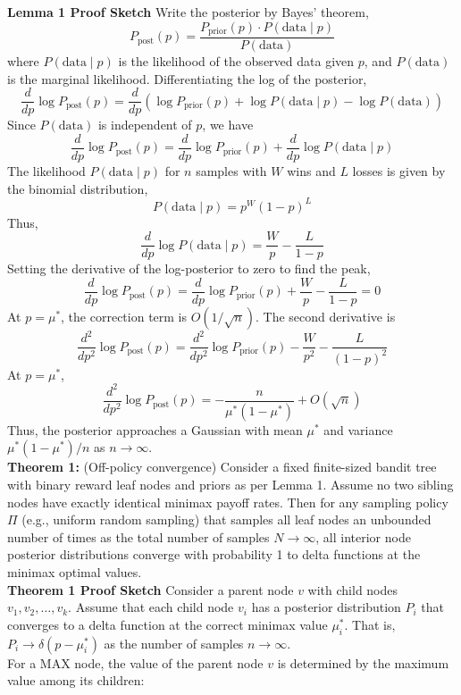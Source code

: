 \documentclass[11pt]{article}
\theoremstyle{definitionstyle}
\begin{document}
\textbf{Lemma 1 Proof Sketch} Write the posterior by Bayes' theorem,
\[
P_{\text{post}}(p) = \frac{P_{\text{prior}}(p) \cdot P(\text{data} \mid p)}{P(\text{data})}
\]
where \(P(\text{data} \mid p)\) is the likelihood of the observed data given \(p\), and \(P(\text{data})\) is the marginal likelihood. Differentiating the log of the posterior,
\[
\frac{d}{dp} \log P_{\text{post}}(p) = \frac{d}{dp} \left( \log P_{\text{prior}}(p) + \log P(\text{data} \mid p) - \log P(\text{data}) \right)
\]
Since \(P(\text{data})\) is independent of \(p\), we have
\[
\frac{d}{dp} \log P_{\text{post}}(p) = \frac{d}{dp} \log P_{\text{prior}}(p) + \frac{d}{dp} \log P(\text{data} \mid p)
\]
The likelihood \(P(\text{data} \mid p)\) for \(n\) samples with \(W\) wins and \(L\) losses is given by the binomial distribution,
\[
P(\text{data} \mid p) = p^W (1 - p)^L
\]
Thus,
\[
\frac{d}{dp} \log P(\text{data} \mid p) = \frac{W}{p} - \frac{L}{1 - p}
\]
Setting the derivative of the log-posterior to zero to find the peak,
\[
\frac{d}{dp} \log P_{\text{post}}(p) = \frac{d}{dp} \log P_{\text{prior}}(p) + \frac{W}{p} - \frac{L}{1 - p} = 0
\]
At \(p = \mu^*\), the correction term is \(O(1/\sqrt{n})\). The second derivative is
\[
\frac{d^2}{dp^2} \log P_{\text{post}}(p) = \frac{d^2}{dp^2} \log P_{\text{prior}}(p) - \frac{W}{p^2} - \frac{L}{(1 - p)^2}
\]
At \(p = \mu^*\),
\[
\frac{d^2}{dp^2} \log P_{\text{post}}(p) = -\frac{n}{\mu^*(1 - \mu^*)} + O(\sqrt{n})
\]
Thus, the posterior approaches a Gaussian with mean \(\mu^*\) and variance \(\mu^*(1 - \mu^*)/n\) as \(n \to \infty\).\\
\textbf{Theorem 1:} (Off-policy convergence) Consider a fixed finite-sized bandit tree with binary reward leaf nodes and priors as per Lemma 1. Assume no two sibling nodes have exactly identical minimax payoff rates. Then for any sampling policy $\Pi$ (e.g., uniform random sampling) that samples all leaf nodes an unbounded number of times as the total number of samples $N \to \infty$, all interior node posterior distributions converge with probability 1 to delta functions at the minimax optimal values.\\
\textbf{Theorem 1 Proof Sketch} Consider a parent node \(v\) with child nodes \(v_1, v_2, \ldots, v_k\). Assume that each child node \(v_i\) has a posterior distribution \(P_i\) that converges to a delta function at the correct minimax value \(\mu_i^*\). That is, \(P_i \to \delta(p - \mu_i^*)\) as the number of samples \(n \to \infty\).\\
For a MAX node, the value of the parent node \(v\) is determined by the maximum value among its children:
\end{document}
